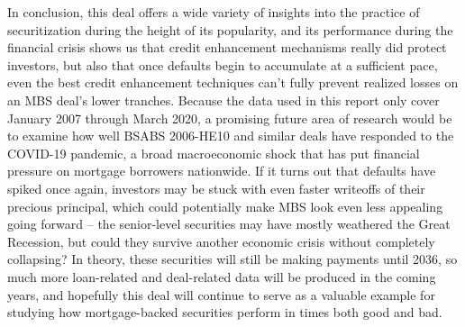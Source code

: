 \documentclass[12pt]{article}
\begin{document}
In conclusion, this deal offers a wide variety of insights into the practice of securitization during the height of its popularity, and its performance during the financial crisis shows us that credit enhancement mechanisms really did protect investors, but also that once defaults begin to accumulate at a sufficient pace, even the best credit enhancement techniques can’t fully prevent realized losses on an MBS deal’s lower tranches. Because the data used in this report only cover January 2007 through March 2020, a promising future area of research would be to examine how well BSABS 2006-HE10 and similar deals have responded to the COVID-19 pandemic, a broad macroeconomic shock that has put financial pressure on mortgage borrowers nationwide. If it turns out that defaults have spiked once again, investors may be stuck with even faster writeoffs of their precious principal, which could potentially make MBS look even less appealing going forward – the senior-level securities may have mostly weathered the Great Recession, but could they survive another economic crisis without completely collapsing? In theory, these securities will still be making payments until 2036, so much more loan-related and deal-related data will be produced in the coming years, and hopefully this deal will continue to serve as a valuable example for studying how mortgage-backed securities perform in times both good and bad.

\newpage

\nocite{*}
\printbibliography

\newpage
\end{document}
